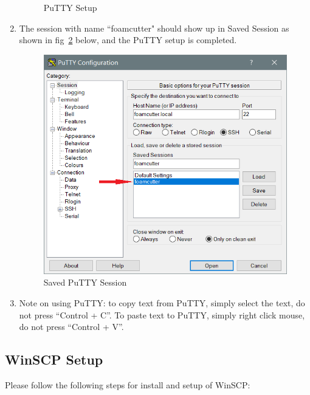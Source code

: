 \documentclass[titlepage,12pt,letter]{report}
\numberwithin{equation}{chapter}
\begin{document}
\begin{enumerate}[itemsep = 5pt,topsep=0pt]
\begin{figure} [H]
		\caption{PuTTY Setup}
		\label{fig:putty2}
	\end{figure}
	\item The session with name ``foamcutter" should show up in Saved Session as shown in fig~\ref{fig:putty3} below, and the PuTTY setup is completed.
	\begin{figure} [H]
		\includegraphics[width = 0.6\linewidth]{./Figures/Laptop_Setup/putty3.png}
		\caption{Saved PuTTY Session}
		\label{fig:putty3}
	\end{figure}
	\item Note on using PuTTY: to copy text from PuTTY, simply select the text, do not press ``Control + C''. To paste text to PuTTY, simply right click mouse, do not press ``Control + V''.
\end{enumerate}

\subsection{WinSCP Setup}

\noindent Please follow the following steps for install and setup of WinSCP:
\end{document}
